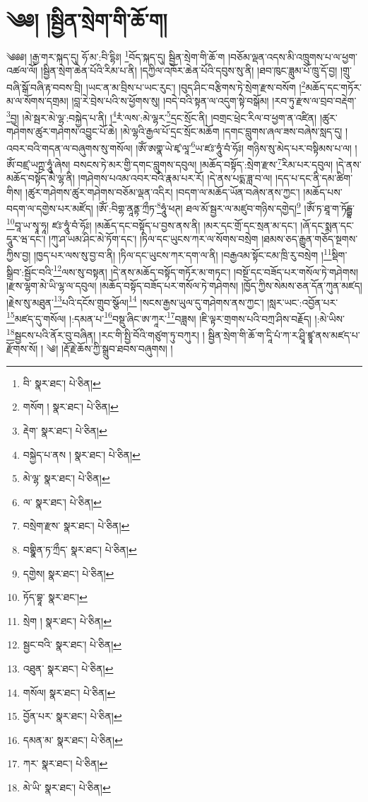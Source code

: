 \setcounter{footnote}{0} 
\chapter{༄༅། །སྦྱིན་སྲེག་གི་ཆོ་ག།}༄༅༅། །རྒྱ་གར་སྐད་དུ། ཧོ་མ་:བི་དྷིཿ། \footnote{བི་  སྣར་ཐང་།  པེ་ཅིན། }བོད་སྐད་དུ། སྦྱིན་སྲེག་གི་ཆོ་ག །བཅོམ་ལྡན་འདས་མི་འཁྲུགས་པ་ལ་ཕྱག་འཚལ་ལོ། །སྦྱིན་སྲེག་ཆེན་པོའི་རིམ་པ་ནི། །དཀྱིལ་འཁོར་ཆེན་པོའི་དབུས་སུ་ནི། །ཐབ་ཁུང་ཟླུམ་པོ་ཁྲུ་དོ་བྱ། །གྲུ་བཞི་སྒོ་བཞི་རྟ་བབས་བྲི། །ཡང་ན་མ་བྲིས་པ་ཡང་རུང་། །བུད་ཤིང་བརྩིགས་ཏེ་སྲེག་རྫས་བསོག །\footnote{གསོག །  སྣར་ཐང་།  པེ་ཅིན། }མཆོད་དང་གཏོར་མ་ལ་སོགས་དགྲམ། །བླ་རེ་བྲེས་པའི་ས་ཕྱོགས་སུ། །བདེ་བའི་སྟན་ལ་འདུག་སྟེ་བསྒོམ། །རབ་ཏུ་རྫས་ལ་བྲབ་བརྡེག་\footnote{རྡེག་  སྣར་ཐང་།  པེ་ཅིན། }བྱ། །མེ་སྦར་མེ་ལྷ་:བསྐྱེད་པ་ནི། །\footnote{བསྐྱེད་པ་ནས །  སྣར་ཐང་།  པེ་ཅིན། }རཾ་ལས་:མེ་ལྷར་\footnote{མེ་ལྷ་  སྣར་ཐང་།  པེ་ཅིན། }དྲང་སྲོང་ནི། །བགྲང་ཕྲེང་རིལ་བ་ཕྱག་ན་འཛིན། །ཚུར་གཤེགས་ཚུར་གཤེགས་འབྱུང་པོ་ཆེ། །མེ་ལྷའི་རྒྱལ་པོ་དྲང་སྲོང་མཆོག །དགང་བླུགས་ཞལ་ཟས་བཞེས་སླད་དུ། །འབར་བའི་གདན་ལ་བཞུགས་སུ་གསོལ། །ཨོཾ་ཨགྣ་ཡེ་ཛྭ་ལཱ་\footnote{ལ་  སྣར་ཐང་།  པེ་ཅིན། }ཡ་ཛཿ་ཧཱུཾ་བཾ་ཧོཿ། གཉིས་སུ་མེད་པར་བསྟིམས་པ་ལ། །ཨོཾ་བཛྲ་ཡཀྵ་ཧཱུཾ་ཞེས། བསངས་ཏེ་མར་གྱི་དགང་བླུགས་དབུལ། །མཆོད་བསྟོད་:སྲེག་རྫས་\footnote{བསྲེག་རྫས་  སྣར་ཐང་།  པེ་ཅིན། }རིམ་པར་དབུལ། །དེ་ནས་མཆོད་བསྟོད་མེ་ལྷ་ནི། །གཤེགས་པའམ་འབར་བའི་རྣམ་པར་རོ། །དེ་ནས་པདྨ་ཟླ་བ་ལ། །དད་པ་དང་ནི་དམ་ཚིག་གིས། །ཚུར་གཤེགས་ཚུར་གཤེགས་བཅོམ་ལྡན་འདིར། །བདག་ལ་མཆོད་ཡོན་བཞེས་ནས་ཀྱང་། །མཆོད་པས་བདག་ལ་དགྱེས་པར་མཛོད། །ཨོཾ་:བིགྷ་ནཱནྟ་ཀྲྀཏ་\footnote{བགྷྣིན་ཏ་ཀྲྀད་  སྣར་ཐང་།  པེ་ཅིན། }ཧཱུཾ་ཕཊ། ཐལ་མོ་སྦྱར་ལ་མཛུབ་གཉིས་དགྱེད།\footnote{དགྱེས།  སྣར་ཐང་།  པེ་ཅིན། } །ཨོཾ་ཏ་ཐཱ་ག་ཏོངྦྷ་\footnote{ཏོད་བྷཱ་  སྣར་ཐང་། }བཱ་ཡ་སྭཱ་ཧཱ། ཛཿ་ཧཱུཾ་བཾ་ཧོཿ། །མཆོད་དང་བསྟོད་པ་བྱས་ནས་ནི། །མར་དང་གྲོ་དང་སྲན་མ་དང་། །ཞོ་དང་སྨན་དང་དཱུར་ཝ་དང་། །ཀུ་ཤ་ཡམ་ཤིང་མེ་ཏོག་དང་། །ཏིལ་དང་ཡུངས་ཀར་ལ་སོགས་བསྲེག །ཐམས་ཅད་རྒྱུན་གཅོད་སྔགས་ཀྱིས་བྱ། །ཁྱད་པར་ལས་སུ་བྱ་བ་ནི། །ཏིལ་དང་ཡུངས་ཀར་དག་ལ་ནི། །བརྒྱའམ་སྟོང་ངམ་ཁྲི་རུ་བསྲེག །\footnote{སྲེག །  སྣར་ཐང་།  པེ་ཅིན། }སྡིག་སྒྲིབ་:སྦྱོང་བའི་\footnote{སྦྱང་བའི་  སྣར་ཐང་།  པེ་ཅིན། }ལས་སུ་བསྟན། །དེ་ནས་མཆོད་བསྟོད་གཏོར་མ་གཏང་། །བསྔོ་དང་བཟོད་པར་གསོལ་ཏེ་གཤེགས། །རྫས་ལྷག་མེ་ཡི་ལྷ་ལ་དབུལ། །མཆོད་བསྟོད་བཟོད་པར་གསོལ་ཏེ་གཤེགས། །ཁྱོད་ཀྱིས་སེམས་ཅན་དོན་ཀུན་མཛད། །རྗེས་སུ་མཐུན་\footnote{འཐུན་  སྣར་ཐང་།  པེ་ཅིན། }པའི་དངོས་གྲུབ་སྩོལ།\footnote{གསོལ།  སྣར་ཐང་།  པེ་ཅིན། } །སངས་རྒྱས་ཡུལ་དུ་གཤེགས་ནས་ཀྱང་། །སླར་ཡང་:འབྱོན་པར་\footnote{བྱོན་པར་  སྣར་ཐང་།  པེ་ཅིན། }མཛད་དུ་གསོལ། །:དམན་པ་\footnote{དམན་མ་  སྣར་ཐང་།  པེ་ཅིན། }བསྡུ་ཞིང་ཨ་ཀཱར་\footnote{ཀར་  སྣར་ཐང་།  པེ་ཅིན། }བཟླས། །ཇི་ལྟར་གྲགས་པའི་བཀྲ་ཤིས་བརྗོད། །:མེ་ཡིས་\footnote{མེ་ཡི་  སྣར་ཐང་།  པེ་ཅིན། }སྦྱངས་པའི་ནོར་བུ་བཞིན། །རང་གི་སྤྱི་བོའི་གཙུག་ཏུ་བཀུར། །
སྦྱིན་སྲེག་གི་ཆོ་ག་དཱི་པཾ་ཀ་ར་ཤྲཱི་ཛྙཱ་ནས་མཛད་པ་རྫོགས་སོ། ། ༄། །རྡོ་རྗེ་ཆོས་ཀྱི་སྒྲུབ་ཐབས་བཞུགས། །